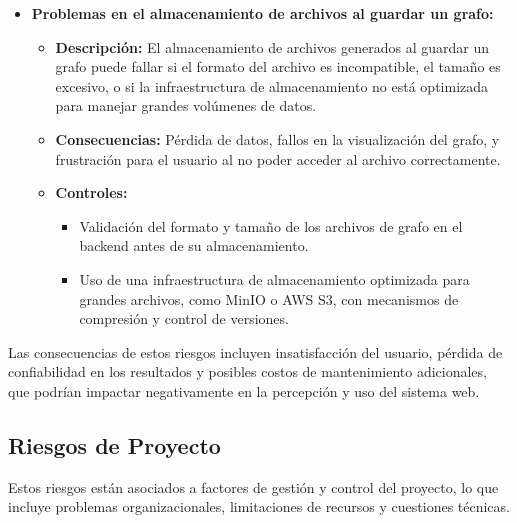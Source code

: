 \documentclass[stu, 12pt, letterpaper, donotrepeattitle, floatsintext, natbib]{apa7}
\begin{document}
\begin{itemize}
    \item \textbf{Problemas en el almacenamiento de archivos al guardar un grafo:} 
    \begin{itemize}
        \item \textbf{Descripción:} El almacenamiento de archivos generados al guardar un grafo puede fallar si el formato del archivo es incompatible, el tamaño es excesivo, o si la infraestructura de almacenamiento no está optimizada para manejar grandes volúmenes de datos.
        \item \textbf{Consecuencias:} Pérdida de datos, fallos en la visualización del grafo, y frustración para el usuario al no poder acceder al archivo correctamente.
        \item \textbf{Controles:} 
        \begin{itemize}
            \item Validación del formato y tamaño de los archivos de grafo en el backend antes de su almacenamiento.
            \item Uso de una infraestructura de almacenamiento optimizada para grandes archivos, como MinIO o AWS S3, con mecanismos de compresión y control de versiones.
        \end{itemize}
    \end{itemize}

\end{itemize}

\noindent Las consecuencias de estos riesgos incluyen insatisfacción del usuario, pérdida de confiabilidad en los resultados y posibles costos de mantenimiento adicionales, que podrían impactar negativamente en la percepción y uso del sistema web.

\subsection{Riesgos de Proyecto}
Estos riesgos están asociados a factores de gestión y control del proyecto, lo que incluye problemas organizacionales, limitaciones de recursos y cuestiones técnicas.
\end{document}

